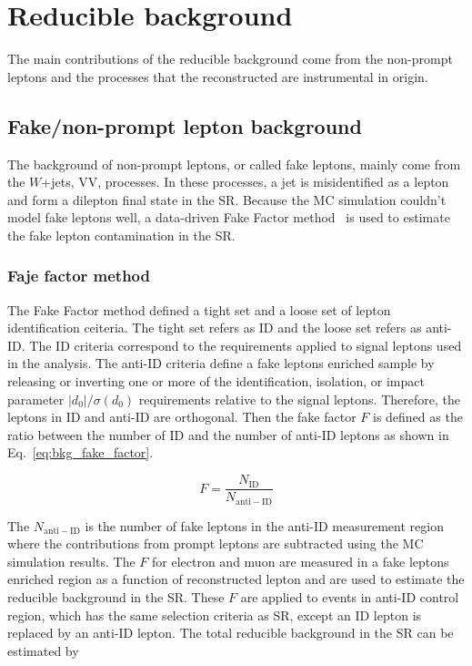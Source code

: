 
\section{Reducible background}
\label{sec:bkg_reducible_background}
The main contributions of the reducible background come from the non-prompt leptons and the processes that the reconstructed \met are instrumental in origin.


\subsection{Fake/non-prompt lepton background}
\label{subsec:bkg_fake_lepton_background}
The background of non-prompt leptons, or called fake leptons, mainly come from the $W$+jets, VV, \ttbar processes.
In these processes, a jet is misidentified as a lepton and form a dilepton final state in the SR.
Because the MC simulation couldn't model fake leptons well, a data-driven Fake Factor method~\cite{ATLAS:2014aga} is used to estimate the fake lepton contamination in the SR. 


\subsubsection{Faje factor method}
\label{subsubsec:bkg_fake_factor_method}
The Fake Factor method defined a tight set and a loose set of lepton identification ceiteria.
The tight set refers as ID and the loose set refers as anti-ID.
The ID criteria correspond to the requirements applied to signal leptons used in the analysis.
The anti-ID criteria define a fake leptons enriched sample by releasing or inverting one or more of the identification, isolation, or impact parameter $|d_{0}|/\sigma(d_{0})$ requirements relative to the signal leptons.
Therefore, the leptons in ID and anti-ID are orthogonal.
Then the fake factor $F$ is defined as the ratio between the number of ID and the number of anti-ID leptons as shown in Eq.~\ref{eq:bkg_fake_factor}.

\begin{equation}
    F = \frac{N_\mathrm{ID}}{N_\mathrm{anti-ID}}
    \label{eq:bkg_fake_factor}
\end{equation}

The $N_\mathrm{anti-ID}$ is the number of fake leptons in the anti-ID measurement region where the contributions from prompt leptons are subtracted using the MC simulation results.
The $F$ for electron and muon are measured in a fake leptons enriched region as a function of reconstructed lepton \pt and are used to estimate the reducible background in the SR.
These $F$ are applied to events in anti-ID control region, which has the same selection criteria as SR, except an ID lepton is replaced by an anti-ID lepton.
The total reducible background in the SR can be estimated by

